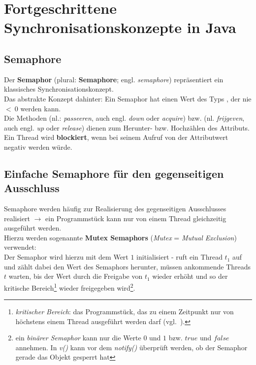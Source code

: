 \section{Fortgeschrittene Synchronisationskonzepte in Java}
\subsection{Semaphore}

Der \textbf{Semaphor} (plural: \textbf{Semaphore}; engl. \textit{semaphore}) repräsentiert ein klassisches Synchronisationskonzept.\\

\noindent
Das abstrakte Konzept dahinter: Ein Semaphor hat einen Wert des Typs , der nie $<\ 0$ werden kann.\\
Die Methoden  (nl.: \textit{passeeren}, auch engl. \textit{down} oder \textit{acquire}) bzw.  (nl. \textit{frijgeven}, auch engl. \textit{up} oder \textit{release}) dienen zum Herunter- bzw. Hochzählen des Attributs.\\

\noindent
Ein Thread wird \textbf{blockiert}, wenn bei seinem Aufruf von  der Attributwert negativ werden würde.

\subsection{Einfache Semaphore für den gegenseitigen Ausschluss}

Semaphore werden häufig zur Realisierung des gegenseitigen Ausschlusses realisiert $\rightarrow$ ein Programmstück kann nur von einem Thread gleichzeitig ausgeführt werden.\\

\noindent
Hierzu werden sogenannte \textbf{Mutex Semaphors} (\textit{Mutex} = \textit{Mutual Exclusion}) verwendet:\\
Der Semaphor wird hierzu mit dem Wert $1$ initialisiert - ruft ein Thread $t_1$  auf und zählt dabei den Wert des Semaphors herunter, müssen ankommende Threads $t$ warten, bis der Wert durch die Freigabe von $t_1$ wieder erhöht und so der kritische Bereich\footnote{
    \textit{kritischer Bereich}: das Programmstück, das zu einem Zeitpunkt nur von höchstens einem Thread ausgeführt werden darf (vgl.~\cite[102]{Oec22}).
} wieder freigegeben wird\footnote{ein \textit{binärer Semaphor} kann nur die Werte $0$ und $1$ bzw. $true$ und $false$ annehmen. In \textit{v()} kann vor dem \textit{notify()} überprüft werden, ob der Semaphor gerade das Objekt gesperrt hat}.\\

